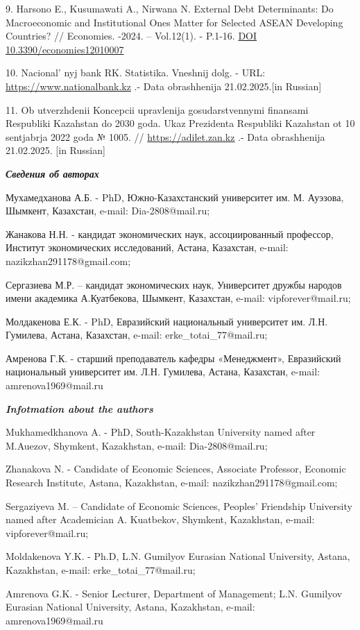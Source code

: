 \begin{references}
9. Harsono E., Kusumawati A., Nirwana N. External Debt Determinants: Do
Macroeconomic and Institutional Ones Matter for Selected ASEAN
Developing Countries? // Economies. -2024. -- Vol.12(1). - P.1-16.
\href{https://doi.org/10.3390/economies12010007}{DOI
10.3390/economies12010007}

10. Nacional' nyj bank RK. Statistika. Vneshnij dolg. -
URL: \href{https://www.nationalbank.kz/ru/news/vneshniy-dolg}{https://www.nationalbank.kz}
.- Data obrashhenija 21.02.2025.{[}in Russian{]}

11. Ob utverzhdenii Koncepcii upravlenija gosudarstvennymi finansami
Respubliki Kazahstan do 2030 goda. Ukaz Prezidenta Respubliki Kazahstan
ot 10 sentjabrja 2022 goda № 1005. //
\href{https://adilet.zan.kz/rus/docs/U2200001005}{https://adilet.zan.kz} .- Data obrashhenija
21.02.2025. {[}in Russian{]}
\end{references}

\begin{authorinfo}
\emph{{\bfseries Сведения об авторах}}

Мухамедханова А.Б. - PhD, Южно-Казахстанский университет им. М. Ауэзова,
Шымкент, Казахстан, e-mail: Dia-2808@mail.ru;

Жанакова Н.Н. - кандидат экономических наук, ассоциированный профессор,
Институт экономических исследований, Астана, Казахстан, e-mail:
nazikzhan291178@gmail.com;

Сергазиева М.Р. -- кандидат экономических наук, Университет дружбы
народов имени академика А.Куатбекова, Шымкент, Казахстан, e-mail:
vipforever@mail.ru;

Молдакенова Е.К. - PhD, Евразийский национальный университет им. Л.Н.
Гумилева, Астана, Казахстан, e-mail:
erke\_totai\_77@mail.ru;

Амренова Г.К. - старший преподаватель кафедры «Менеджмент», Евразийский
национальный университет им. Л.Н. Гумилева, Астана, Казахстан, e-mail:
amrenova1969@mail.ru

\emph{{\bfseries Infotmation about the authors}}

Mukhamedkhanova A. - PhD, South-Kazakhstan University named after
M.Auezov, Shymkent, Kazakhstan, e-mail: Dia-2808@mail.ru;

Zhanakova N. - Candidate of Economic Sciences, Associate Professor,
Economic Research Institute, Astana, Kazakhstan, e-mail:
nazikzhan291178@gmail.com;

Sergaziyeva M. -- Candidate of Economic Sciences,
Peoples'{} Friendship University named after Academician
A. Kuatbekov, Shymkent, Kazakhstan, e-mail: vipforever@mail.ru;

Moldakenova Y.K. - Ph.D, L.N. Gumilyov Eurasian National University,
Astana, Kazakhstan, e-mail: erke\_totai\_77@mail.ru;

Amrenova G.K. - Senior Lecturer, Department of Management; L.N. Gumilyov
Eurasian National University, Astana, Kazakhstan, e-mail:
amrenova1969@mail.ru
\end{authorinfo}
